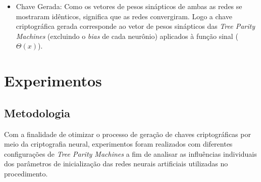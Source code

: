 \documentclass[12pt]{article}
\begin{document}
        \begin{itemize}
            \item Chave Gerada:
            Como os vetores de pesos sinápticos de ambas as redes se mostraram idênticos, significa que as redes convergiram. Logo a chave criptográfica gerada corresponde ao vetor de pesos sinápticos das \textit{Tree Parity Machines} (excluindo o \textit{bias} de cada neurônio) aplicados à função sinal (\textit{$\Theta(x)$}).
        \end{itemize}
        
    \section{Experimentos}
    \label{sec:experimentos}
  
        \subsection{Metodologia}
        \label{subsec:metodologia}
            
            Com a finalidade de otimizar o processo de geração de chaves criptográficas por meio da criptografia neural, experimentos foram realizados com diferentes configurações de \textit{Tree Parity Machines} a fim de analisar as influências individuais dos parâmetros de inicialização das redes neurais artificiais utilizadas no procedimento.
            
\end{document}
